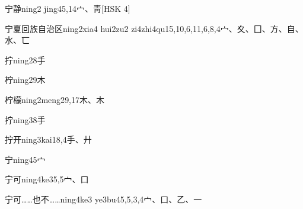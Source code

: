 \begin{EntryWithPhonetic}{宁静}{ning2 jing4}{5,14}{⼧、⾭}[HSK 4]
\end{EntryWithPhonetic}

\begin{EntryWithPhonetic}{宁夏回族自治区}{ning2xia4 hui2zu2 zi4zhi4qu1}{5,10,6,11,6,8,4}{⼧、⼢、⼞、⽅、⾃、⽔、⼖}
\end{EntryWithPhonetic}

\begin{EntryWithPhonetic}{拧}{ning2}{8}{⼿}
\end{EntryWithPhonetic}

\begin{EntryWithPhonetic}{柠}{ning2}{9}{⽊}
\end{EntryWithPhonetic}

\begin{EntryWithPhonetic}{柠檬}{ning2meng2}{9,17}{⽊、⽊}
\end{EntryWithPhonetic}

\begin{EntryWithPhonetic}{拧}{ning3}{8}{⼿}
\end{EntryWithPhonetic}

\begin{EntryWithPhonetic}{拧开}{ning3kai1}{8,4}{⼿、⼶}
\end{EntryWithPhonetic}

\begin{EntryWithPhonetic}{宁}{ning4}{5}{⼧}
\end{EntryWithPhonetic}

\begin{EntryWithPhonetic}{宁可}{ning4ke3}{5,5}{⼧、⼝}
\end{EntryWithPhonetic}

\begin{EntryWithPhonetic}{宁可……也不……}{ning4ke3 ye3bu4}{5,5,3,4}{⼧、⼝、⼄、⼀}
\end{EntryWithPhonetic}

